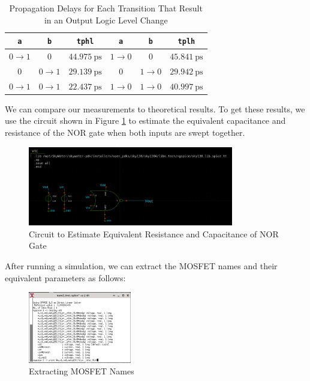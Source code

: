 \documentclass[fleqn]{article}
\begin{document}
	\begin{table}[H]
	\begin{center}
	\caption{Propagation Delays for Each Transition That Result in an Output Logic Level Change}
	\label{table::nor_gate_delay_analysis}
	\begin{tabular}{| c | c | c || c | c | c |}
		\hline
		\texttt{a} & \texttt{b} & \texttt{tphl} & \texttt{a} & \texttt{b} & \texttt{tplh} \\
		\hline	
		$0 \rightarrow 1$ & $0$ & $44.975\ \text{ps}$ & $1 \rightarrow 0$ & $0$ & $45.841\ \text{ps}$\\
		\hline	
		$0$ & $0 \rightarrow 1$ & $29.139\ \text{ps}$ & $0$ & $1 \rightarrow 0$ & $29.942\ \text{ps}$\\
		\hline	
		$0 \rightarrow 1$ & $0 \rightarrow 1$ & $22.437\ \text{ps}$ & $1 \rightarrow 0$ & $1 \rightarrow 0$ & $40.997\ \text{ps}$\\
		\hline
	\end{tabular}
	\end{center}
	\end{table}
	
	We can compare our measurements to theoretical results. To get these results, we use the circuit shown in Figure \ref{fig::nor_eq_test_sweep_va_vb} to estimate the equivalent capacitance and resistance of the NOR gate when both inputs are swept together.
	
	\begin{figure}[H]
		\centerline{\includegraphics[width=0.8\textwidth]{nor_eq_test_sweep_va_vb.png}}
		\caption{Circuit to Estimate Equivalent Resistance and Capacitance of NOR Gate}
		\label{fig::nor_eq_test_sweep_va_vb}
	\end{figure}
	
	\noindent After running a simulation, we can extract the MOSFET names and their equivalent parameters as follows:
	
	\begin{figure}[H]
		\centerline{\includegraphics[width=0.4\textwidth]{nand_eq_display_sweep_va_vb.png}}
		\caption{Extracting MOSFET Names}
		\label{fig::nor_eq_display_sweep_va_vb}
	\end{figure}
	
\end{document}

